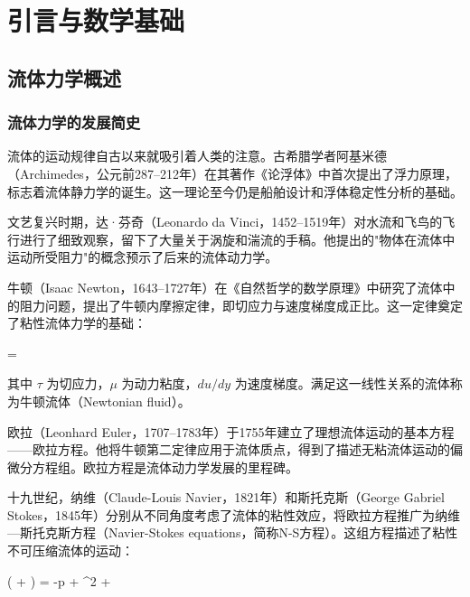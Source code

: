 \chapter{引言与数学基础}


\section{流体力学概述}

\subsection{流体力学的发展简史}

流体的运动规律自古以来就吸引着人类的注意。古希腊学者阿基米德（Archimedes，公元前287--212年）在其著作《论浮体》中首次提出了浮力原理，标志着流体静力学的诞生。这一理论至今仍是船舶设计和浮体稳定性分析的基础。

文艺复兴时期，达·芬奇（Leonardo da Vinci，1452--1519年）对水流和飞鸟的飞行进行了细致观察，留下了大量关于涡旋和湍流的手稿。他提出的"物体在流体中运动所受阻力"的概念预示了后来的流体动力学。

牛顿（Isaac Newton，1643--1727年）在《自然哲学的数学原理》中研究了流体中的阻力问题，提出了牛顿内摩擦定律，即切应力与速度梯度成正比。这一定律奠定了粘性流体力学的基础：

\begin{myformula}
\tau = \mu {}
\end{myformula}

其中 \(\tau\) 为切应力，\(\mu\) 为动力粘度，\(du/dy\) 为速度梯度。满足这一线性关系的流体称为牛顿流体（Newtonian fluid）。

欧拉（Leonhard Euler，1707--1783年）于1755年建立了理想流体运动的基本方程——欧拉方程。他将牛顿第二定律应用于流体质点，得到了描述无粘流体运动的偏微分方程组。欧拉方程是流体动力学发展的里程碑。

十九世纪，纳维（Claude-Louis Navier，1821年）和斯托克斯（George Gabriel Stokes，1845年）分别从不同角度考虑了流体的粘性效应，将欧拉方程推广为纳维—斯托克斯方程（Navier-Stokes equations，简称N-S方程）。这组方程描述了粘性不可压缩流体的运动：

\begin{myformula}
\rho\left( + \cdot\Nabla{}\right) = -\Nabla p + \mu \Nabla^2  + \rho {}
\end{myformula}

